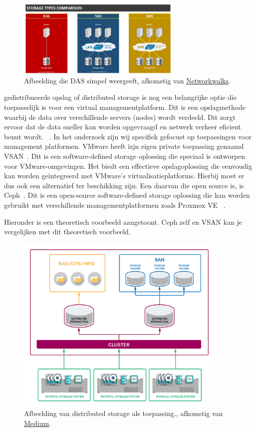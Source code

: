 \begin{figure}[h!]
    \centering
    \includegraphics[width=0.7\textwidth]{../onderzoek/DAS.jpg} 
    \caption{Afbeelding die DAS simpel weergeeft, afkomstig van \href{https://networkwalks.com/storage-types-das-nas-san/I}{Networkwalks}.}
    \label{fig:das}
\end{figure}
\FloatBarrier
gedistribueerde opslag of distributed storage is nog een belangrijke optie die toepasselijk is voor een virtual managementplatform. Dit is een opslagmethode waarbij de data over verschillende servers (nodes) wordt verdeeld. Dit zorgt ervoor dat de data sneller kan worden opgevraagd en netwerk verkeer eficient benut wordt. ~\autocite{patil2010unified}.
In het onderzoek zijn wij specifiek gefocust op toepassingen voor management platformen. VMware heeft izjn eigen private toepassing genaamd VSAN~\autocite{hogan2016essential}. Dit is een software-defined storage oplossing die speciaal is ontworpen voor VMware-omgevingen. Het biedt een effectieve opslagoplossing die eenvoudig kan worden geïntegreerd met VMware's virtualisatieplatforms.
Hierbij moet er dus ook een alternatief ter beschikking zijn. Een daarvan die open source is, is Ceph~\autocite{weil2006ceph}. Dit is een open-source software-defined storage oplossing die kan worden gebruikt met verschillende managementplatformen zoals Proxmox VE ~\autocite{Proxmox}.

Hieronder is een theoretisch voorbeeld aangetoont. Ceph zelf en VSAN kan je vergelijken met dit theoretisch voorbeeld.
\begin{figure}[h!]
  \centering
  \includegraphics[width=0.9\textwidth]{../onderzoek/dssep.png} 
  \caption{Afbeelding van distributed storage als toepassing., afkomstig van \href{https://medium.com/systemdesign-us-blog/how-does-storage-work-in-distributed-systems-fde890e88a7f}{Medium}.}
  \label{fig:das}
\end{figure}